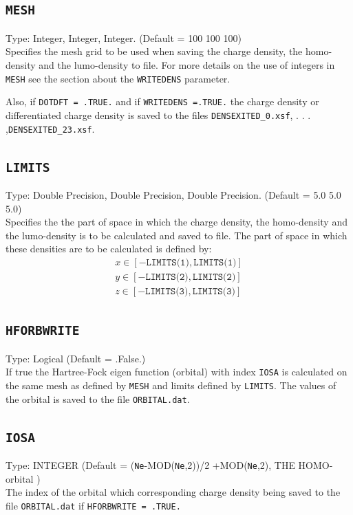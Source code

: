 \documentclass[a4paper,twoside,openany]{book}
\begin{document}
{{{{\subsection{\texttt{MESH}}
Type: Integer, Integer, Integer. (Default = 100 100 100)\\
Specifies the mesh grid to be used when saving the charge density, the homo-density  and the lumo-density to file. For more details on the use of integers in \texttt{MESH} see 
the section about the \texttt{WRITEDENS} parameter.

Also, if \texttt{DOTDFT = .TRUE.}  and if  \texttt{WRITEDENS =.TRUE.} the charge density or differentiated charge density is saved to the files  \texttt{DENSEXITED\_0.xsf}, . . . ,\texttt{DENSEXITED\_23.xsf}.

\subsection{\texttt{LIMITS}}
Type: Double Precision, Double Precision, Double Precision. (Default = 5.0 5.0 5.0)\\
Specifies the the part of space in which the charge density, the homo-density and the lumo-density is to be calculated and saved to file. The part of space in which these densities 
are to be calculated is defined by:
\begin{eqnarray}
x \in [-\texttt{LIMITS(1)},\texttt{LIMITS(1)}] \nonumber \\
y \in [-\texttt{LIMITS(2)},\texttt{LIMITS(2)}] \nonumber \\
z \in [-\texttt{LIMITS(3)},\texttt{LIMITS(3)}] \nonumber 
\end{eqnarray}

\subsection{\texttt{HFORBWRITE}}
Type: Logical (Default = .False.)\\
If true the Hartree-Fock eigen function (orbital) with index \texttt{IOSA} is calculated on the same mesh as defined by \texttt{MESH} and limits defined by \texttt{LIMITS}. The values of the orbital is
saved to the file \texttt{ORBITAL.dat}.

\subsection{\texttt{IOSA}}
Type: INTEGER (Default = (\texttt{Ne}-MOD(\texttt{Ne},2))/2 +MOD(\texttt{Ne},2), THE HOMO-orbital )\\
The index of the orbital which corresponding charge density  being saved to the file  \texttt{ORBITAL.dat} if  \texttt{HFORBWRITE = .TRUE.}

}}}}
\end{document}
